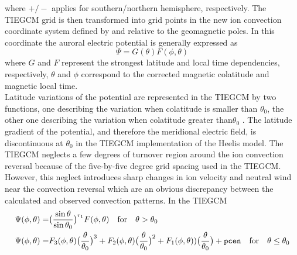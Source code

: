 % 
where $+/-$ applies for southern/northern hemisphere, respectively.
The TIEGCM grid is then
transformed into grid points in the new ion convection 
coordinate system defined by  and  relative to the 
geomagnetic poles. In this coordinate the auroral 
electric potential is generally expressed as
%
\begin{equation}
  \Psi = G(\theta)F(\phi, \theta)
    \label{eq:maginp_6}
\end{equation}
% 
where $G$ and $F$ represent the strongest latitude and local time 
dependencies, respectively, $\theta$ and $\phi$ correspond to the corrected 
magnetic colatitude and magnetic local time. \\
%
Latitude variations of the potential are represented in the 
TIEGCM by two functions, one describing the variation when 
colatitude is smaller than $\theta_0$, the other one describing the 
variation when colatitude greater than$\theta_0$ . The latitude 
gradient of the potential, and therefore the meridional 
electric field, is discontinuous at $\theta_0$ in the TIEGCM 
implementation of the Heelis model. The TIEGCM neglects a few 
degrees of turnover region around the ion convection reversal 
because of the five-by-five degree grid spacing used in the 
TIEGCM. However, this neglect introduces sharp changes in ion 
velocity and neutral wind near the convection reversal which are 
an obvious discrepancy between the calculated and observed 
convection patterns. In the TIEGCM
%
% 
%
\begin{equation}
  \begin{split}
    \Psi(\phi,\theta) = & \bigl( \frac{\sin \theta}{\sin \theta_0} \bigr)^{r_1} F(\phi,\theta) 
             \quad   \text{for}\quad   \theta > \theta_0 \\
    \Psi(\phi,\theta) = & F_3(\phi,\theta)\bigl(\frac{\theta}{\theta_0}\bigr)^3 + 
        F_2(\phi,\theta)\bigl(\frac{\theta}{\theta_0}\bigr)^2 + 
	F_1(\phi,\theta))\bigl(\frac{\theta}{\theta_0}\bigr) + \code{pcen}
	\quad   \text{for} \quad  \theta \leq \theta_0
  \end{split}
    \label{eq:maginp_7}
\end{equation}
